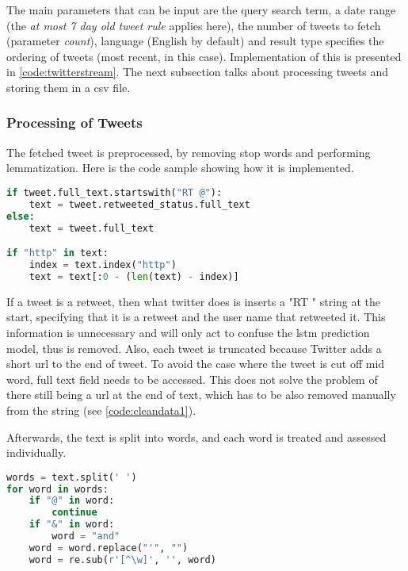             The main parameters that can be input are the query search term, a date range (the \textit{at most 7 day old tweet rule} applies here), the number of tweets to fetch (parameter \textit{count}), language (English by default) and result type specifies the ordering of tweets (most recent, in this case). Implementation of this is presented in \cref{code:twitterstream}. The next subsection talks about processing tweets and storing them in a \gls{csv} file.
            
        \subsubsection{Processing of Tweets}
            The fetched tweet is preprocessed, by removing stop words and performing lemmatization. Here is the code sample showing how it is implemented.
            
            \begin{lstlisting}[language=Python, caption=Cleaning of Data (Part 1), label=code:cleandata1]
if tweet.full_text.startswith("RT @"):
    text = tweet.retweeted_status.full_text
else:
    text = tweet.full_text

if "http" in text:
    index = text.index("http")
    text = text[:0 - (len(text) - index)]
            \end{lstlisting}
            
            If a tweet is a retweet, then what twitter does is inserts a "RT \@" string at the start, specifying that it is a retweet and the user name that retweeted it. This information is unnecessary and will only act to confuse the \gls{lstm} prediction model, thus is removed. Also, each tweet is truncated because Twitter adds a short \gls{url} to the end of tweet. To avoid the case where the tweet is cut off mid word, full text field needs to be accessed. This does not solve the problem of there still being a \gls{url} at the end of text, which has to be also removed manually from the string (see \cref{code:cleandata1}).
            
            Afterwards, the text is split into words, and each word is treated and assessed individually.
            
            \begin{lstlisting}[language=Python, caption=Cleaning of Data (Part 2), label=code:cleandata2]
words = text.split(' ')
for word in words:
    if "@" in word:
        continue
    if "&" in word:
        word = "and"
    word = word.replace("'", "")
    word = re.sub(r'[^\w]', '', word)
            \end{lstlisting}
            
